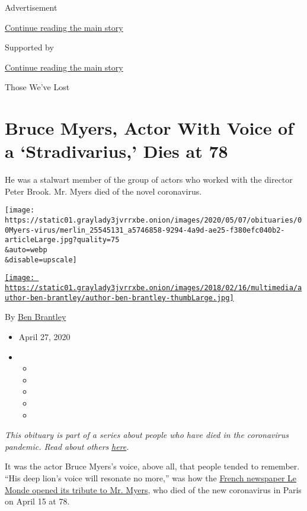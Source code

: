 Advertisement

\protect\hyperlink{after-top}{Continue reading the main story}

Supported by

\protect\hyperlink{after-sponsor}{Continue reading the main story}

Those We've Lost

\hypertarget{bruce-myers-actor-with-voice-of-a-stradivarius-dies-at-78}{%
\section{Bruce Myers, Actor With Voice of a `Stradivarius,' Dies at
78}\label{bruce-myers-actor-with-voice-of-a-stradivarius-dies-at-78}}

He was a stalwart member of the group of actors who worked with the
director Peter Brook. Mr. Myers died of the novel coronavirus.

\texttt{[image: https://static01.graylady3jvrrxbe.onion/images/2020/05/07/obituaries/00Myers-virus/merlin\_25545131\_a5746858-9294-4a9d-ae25-f380efc040b2-articleLarge.jpg?quality=75\\\&auto=webp\\\&disable=upscale]}

\href{https://www.nytimes3xbfgragh.onion/by/ben-brantley}{\texttt{[image: https://static01.graylady3jvrrxbe.onion/images/2018/02/16/multimedia/author-ben-brantley/author-ben-brantley-thumbLarge.jpg]}}

By \href{https://www.nytimes3xbfgragh.onion/by/ben-brantley}{Ben
Brantley}

\begin{itemize}
\item
  April 27, 2020
\item
  \begin{itemize}
  \item
  \item
  \item
  \item
  \item
  \end{itemize}
\end{itemize}

\emph{This obituary is part of a series about people who have died in
the coronavirus pandemic. Read about others}
\href{https://www.nytimes3xbfgragh.onion/series/people-who-have-died-of-the-coronavirus}{\emph{here}}\emph{.}

It was the actor Bruce Myers's voice, above all, that people tended to
remember. ``His deep lion's voice will resonate no more,'' was how the
\href{https://www.lemonde.fr/disparitions/article/2020/04/16/la-mort-de-bruce-myers-fidele-compagnon-de-theatre-de-peter-brook_6036824_3382.html}{French
newspaper Le Monde opened its tribute to Mr. Myers}, who died of the new
coronavirus in Paris on April 15 at 78.

